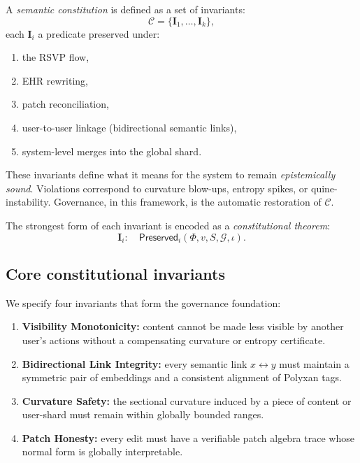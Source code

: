 A \emph{semantic constitution} is defined as a set of invariants:
\[
\mathcal{C} = \{\mathbf{I}_1, \dots, \mathbf{I}_k\},
\]
each $\mathbf{I}_i$ a predicate preserved under:

\begin{enumerate}
  \item the RSVP flow,
  \item EHR rewriting,
  \item patch reconciliation,
  \item user-to-user linkage (bidirectional semantic links),
  \item system-level merges into the global shard.
\end{enumerate}

These invariants define what it means for the system to remain
\emph{epistemically sound}.  
Violations correspond to curvature blow-ups,
entropy spikes, or quine-instability.  
Governance, in this framework, is
the automatic restoration of $\mathcal{C}$.

The strongest form of each invariant is encoded as a \emph{constitutional
theorem}:
\[
\mathbf{I}_i :\quad \mathsf{Preserved}_i(\Phi, v, S, \mathcal{G}, \iota).
\]

\subsection{Core constitutional invariants}

We specify four invariants that form the governance foundation:

\begin{enumerate}
  \item \textbf{Visibility Monotonicity:}
        content cannot be made less visible by another user’s actions
        without a compensating curvature or entropy certificate.

  \item \textbf{Bidirectional Link Integrity:}
        every semantic link $x \leftrightarrow y$ must maintain
        a symmetric pair of embeddings
        and a consistent alignment of Polyxan tags.

  \item \textbf{Curvature Safety:}
        the sectional curvature induced by a piece of content or user-shard
        must remain within globally bounded ranges.

  \item \textbf{Patch Honesty:}
        every edit must have a verifiable
        patch algebra trace whose normal form is globally interpretable.
\end{enumerate}

